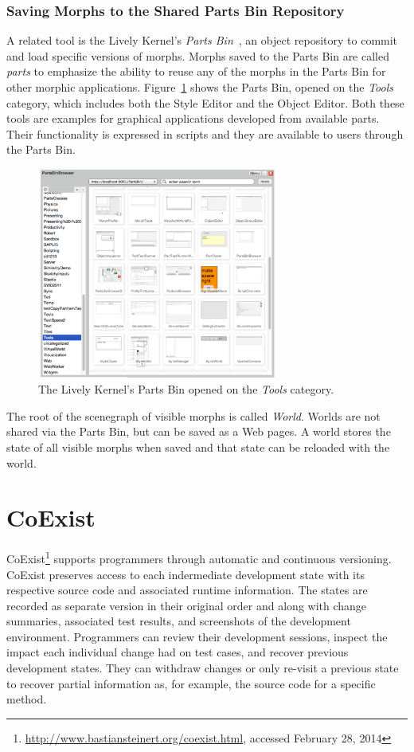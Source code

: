 \subsubsection{Saving Morphs to the Shared Parts Bin Repository}

A related tool is the Lively Kernel's \emph{Parts Bin}~\cite{Lincke2012LPC}, an object repository to commit and load specific versions of morphs.
Morphs saved to the Parts Bin are called \emph{parts} to emphasize the ability to reuse any of the morphs in the Parts Bin for other morphic applications.
Figure~\ref{fig:PartsBin} shows the Parts Bin, opened on the \emph{Tools} category, which includes both the Style Editor and the Object Editor.
Both these tools are examples for graphical applications developed from available parts.
Their functionality is expressed in scripts and they are available to users through the Parts Bin.

\begin{figure}[h]
    \centering
    \includegraphics[width=0.7\textwidth]{figures/2_background/3_partsBin.pdf}
    \caption{The Lively Kernel's Parts Bin opened on the \emph{Tools} category.}
    \label{fig:PartsBin}
\end{figure}

The root of the scenegraph of visible morphs is called \emph{World}.
Worlds are not shared via the Parts Bin, but can be saved as a Web pages.
A world stores the state of all visible morphs when saved and that state can be reloaded with the world.


\section{CoExist}

CoExist\footnote{\url{http://www.bastiansteinert.org/coexist.html}, accessed February 28, 2014} supports programmers through automatic and continuous versioning.
CoExist preserves access to each indermediate development state with its respective source code and associated runtime information.
The states are recorded as separate version in their original order and along with change summaries, associated test results, and screenshots of the development environment.
Programmers can review their development sessions, inspect the impact each individual change had on test cases, and recover previous development states.
They can withdraw changes or only re-visit a previous state to recover partial information as, for example, the source code for a specific method.

